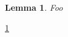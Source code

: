 \usepackage{amsthm}
\newtheorem{lemma}{Lemma}

\begin{lemma}%
\label{thm:foo}
    Foo
\end{lemma}

\ref{thm:foo}
